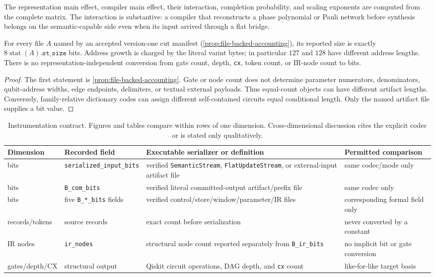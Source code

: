 The representation main effect, compiler main effect, their interaction,
completion probability, and scaling exponents are computed from the complete
matrix.  The interaction is substantive: a compiler that reconstructs a
phase polynomial or Pauli network before synthesis belongs on the
semantic-capable side even when its input arrived through a flat bridge.

\begin{lemma}
\label{lem:metric-conversion}
For every file $A$ named by an accepted version-one cut manifest
(\cref{prop:file-backed-accounting}), its reported size is exactly
$8\operatorname{stat}(A).\mathtt{st\_size}$ bits.  Address growth is charged by
the literal varint bytes; in particular $127$ and $128$ have different address
lengths.  There is no representation-independent conversion from gate count,
depth, \texttt{cx}, token count, or IR-node count to bits.
\end{lemma}

\begin{proof}
The first statement is \cref{prop:file-backed-accounting}.  Gate or node count
does not determine parameter numerators, denominators, qubit-address widths,
edge endpoints, delimiters, or textual external payloads.  Thus equal-count
objects can have different artifact lengths.  Conversely, family-relative
dictionary codes can assign different self-contained circuits equal
conditional length.  Only the named artifact file supplies a bit value.
\end{proof}

\begin{table}[!t]
\centering
\scriptsize
\setlength{\tabcolsep}{3pt}
\begin{tabularx}{\textwidth}{@{}l l X X@{}}
\toprule
Dimension & Recorded field & Executable serializer or definition & Permitted comparison \\
\midrule
bits & \texttt{serialized\_input\_bits} & verified \texttt{SemanticStream}, \texttt{FlatUpdateStream}, or external-input artifact file & same codec/mode only \\
bits & \texttt{B\_com\_bits} & verified literal committed-output artifact/prefix file & same codec only \\
bits & five \texttt{B\_*\_bits} fields & verified control/store/window/parameter/IR files & corresponding formal field only \\
records/tokens & source records & exact count before serialization & never converted by a constant \\
IR nodes & \texttt{ir\_nodes} & structural node count reported separately from \texttt{B\_ir\_bits} & no implicit bit or gate conversion \\
gates/depth/CX & structural output & Qiskit circuit operations, DAG depth, and \texttt{cx} count & like-for-like target basis \\
\bottomrule
\end{tabularx}
\caption{Instrumentation contract.  Figures and tables compare within rows of
one dimension.  Cross-dimensional discussion cites the explicit codec or is
stated only qualitatively.}
\label{tab:instrumentation-contract}
\end{table}

